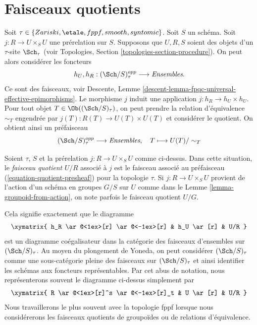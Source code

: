 \section{Faisceaux quotients}
\label{section-quotient-sheaves}

\noindent
Soit $\tau \in\allowbreak \{Zariski,\allowbreak \etale,\allowbreak fppf,\allowbreak smooth,\allowbreak syntomic\}$.
Soit $S$ un schéma.
Soit $j : R \to U \times_S U$ une prérelation sur $S$.
Supposons que $U, R, S$ soient des objets d'un $\tau$-site $\Sch_\tau$
(voir Topologies, Section \ref{topologies-section-procedure}).
On peut alors considérer les foncteurs
$$
h_U, h_R :
(\Sch/S)_\tau^{opp}
\longrightarrow
\textit{Ensembles}.
$$
Ce sont des faisceaux, voir
Descente, Lemme \ref{descent-lemma-fpqc-universal-effective-epimorphisms}.
Le morphisme $j$ induit une application $j : h_R \to h_U \times h_U$.
Pour tout objet $T \in \Ob((\Sch/S)_\tau)$,
on peut prendre la relation d'équivalence $\sim_T$ engendrée par
$j(T) : R(T) \to U(T) \times U(T)$ et considérer le quotient.
On obtient ainsi un préfaisceau
\begin{equation}
\label{equation-quotient-presheaf}
(\Sch/S)_\tau^{opp}
\longrightarrow
\textit{Ensembles}, \quad
T \longmapsto U(T)/\sim_T
\end{equation}

\begin{definition}
\label{definition-quotient-sheaf}
Soient $\tau$, $S$ et la prérelation $j : R \to U \times_S U$ comme ci-dessus.
Dans cette situation, le {\it faisceau quotient $U/R$} associé
à $j$ est le faisceau associé au préfaisceau
(\ref{equation-quotient-presheaf}) pour la topologie $\tau$.
Si $j : R \to U \times_S U$ provient de l'action d'un schéma en groupes
$G/S$ sur $U$ comme dans le Lemme \ref{lemma-groupoid-from-action}, on
note parfois le faisceau quotient $U/G$.
\end{definition}

\noindent
Cela signifie exactement que le diagramme
$$
\xymatrix{
h_R \ar@<1ex>[r] \ar@<-1ex>[r] &
h_U \ar[r] &
U/R
}
$$
est un diagramme coégalisateur dans la catégorie des faisceaux d'ensembles
sur $(\Sch/S)_\tau$. Au moyen du plongement de Yoneda, on
peut considérer $(\Sch/S)_\tau$ comme une sous-catégorie pleine des
faisceaux sur $(\Sch/S)_\tau$ et ainsi identifier les schémas
aux foncteurs représentables. Par cet abus de notation,
nous représenterons souvent le diagramme ci-dessus simplement par
$$
\xymatrix{
R \ar@<1ex>[r]^s \ar@<-1ex>[r]_t &
U \ar[r] &
U/R
}
$$
Nous travaillerons le plus souvent avec la topologie fppf lorsque nous considérerons
les faisceaux quotients de groupoïdes ou de relations d'équivalence.

